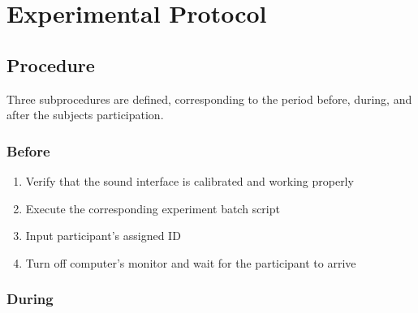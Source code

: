 \documentclass[../main.tex]{subfiles}
\begin{document}
\chapter{Experimental Protocol}
\label{cha:experimental_protocol}

\section{Procedure}

Three subprocedures are defined, corresponding to the period before, during, and
after the subjects participation.

\subsection{Before}

\begin{enumerate}
  \item Verify that the sound interface is calibrated and working properly
  \item Execute the corresponding experiment batch script\footnotemark[1]
  \item Input participant's assigned ID
  \item Turn off computer's monitor and wait for the participant to arrive
\end{enumerate}


\subsection{During}
\end{document}
